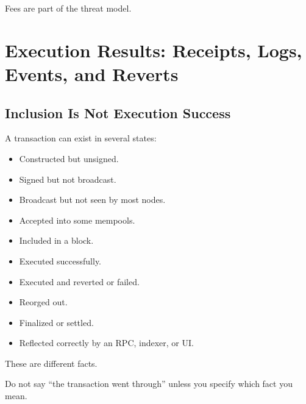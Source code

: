 Fees are part of the threat model.

\section{Execution Results: Receipts, Logs, Events, and Reverts}

\subsection{Inclusion Is Not Execution Success}

A transaction can exist in several states:

\begin{itemize}
\tightlist
\item
  Constructed but unsigned.
\item
  Signed but not broadcast.
\item
  Broadcast but not seen by most nodes.
\item
  Accepted into some mempools.
\item
  Included in a block.
\item
  Executed successfully.
\item
  Executed and reverted or failed.
\item
  Reorged out.
\item
  Finalized or settled.
\item
  Reflected correctly by an RPC, indexer, or UI.
\end{itemize}

These are different facts.

Do not say ``the transaction went through'' unless you specify which
fact you mean.

